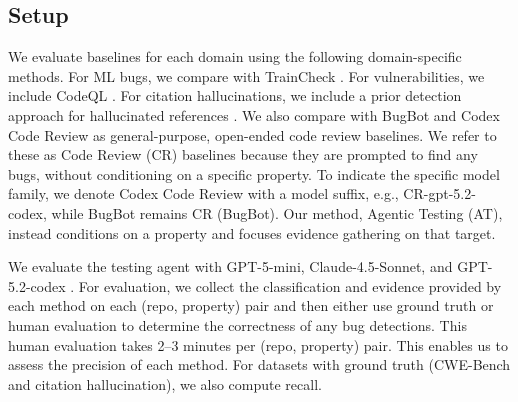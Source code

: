 \documentclass{article}
\theoremstyle{plain}
\theoremstyle{definition}
\theoremstyle{remark}
\begin{document}
\subsection{Setup}



We evaluate baselines for each domain using the following domain-specific methods.
For ML bugs, we compare with TrainCheck \citep{traincheck}.
For vulnerabilities, we include CodeQL \citep{codeql}.
For citation hallucinations, we include a prior detection approach for hallucinated references \citep{agrawal2023hallucinated}.
We also compare with BugBot \citep{cursor_bugbot} and Codex Code Review \citep{openai_codex} as general-purpose, open-ended code review baselines.
We refer to these as Code Review (CR) baselines because they are prompted to find any bugs, without conditioning on a specific property.
To indicate the specific model family, we denote Codex Code Review with a model suffix, e.g., CR-gpt-5.2-codex, while BugBot remains CR (BugBot).
Our method, Agentic Testing (AT), instead conditions on a property and focuses evidence gathering on that target.

We evaluate the testing agent with GPT-5-mini, Claude-4.5-Sonnet, and GPT-5.2-codex \citep{openai_models,anthropic_models}.
For evaluation, we collect the classification and evidence provided by each method on each (repo, property) pair and then either use ground truth or human evaluation to determine the correctness of any bug detections.
This human evaluation takes 2--3 minutes per (repo, property) pair.
This enables us to assess the precision of each method. For datasets with ground truth (CWE-Bench and citation hallucination), we also compute recall.
\end{document}
